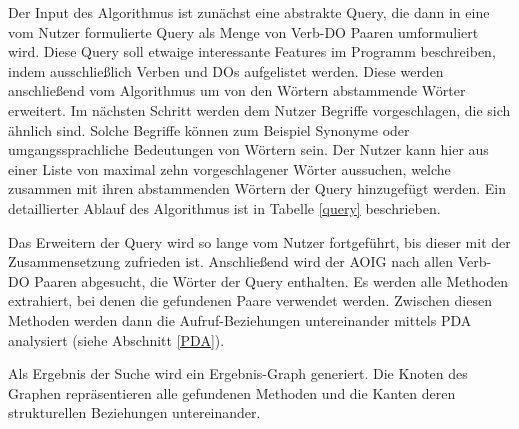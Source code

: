 \documentclass[runningheads,a4paper]{llncs}
\begin{document}
Der Input des Algorithmus ist zunächst eine abstrakte Query, die dann in eine vom Nutzer formulierte Query als Menge von Verb-DO Paaren umformuliert wird. Diese Query soll etwaige interessante Features im Programm beschreiben, indem ausschließlich Verben und DOs aufgelistet werden. Diese werden anschließend vom Algorithmus um von den Wörtern abstammende Wörter erweitert. Im nächsten Schritt werden dem Nutzer Begriffe vorgeschlagen, die sich ähnlich sind. Solche Begriffe können zum Beispiel Synonyme oder umgangssprachliche Bedeutungen von Wörtern sein. Der Nutzer kann hier aus einer Liste von maximal zehn vorgeschlagener Wörter aussuchen, welche zusammen mit ihren abstammenden Wörtern der Query hinzugefügt werden. Ein detaillierter Ablauf des Algorithmus ist in Tabelle \ref{query} beschrieben.

Das Erweitern der Query wird so lange vom Nutzer fortgeführt, bis dieser mit der Zusammensetzung zufrieden ist. Anschließend wird der AOIG nach allen Verb-DO Paaren abgesucht, die Wörter der Query enthalten. Es werden alle Methoden extrahiert, bei denen die gefundenen Paare verwendet werden. Zwischen diesen Methoden werden dann die Aufruf-Beziehungen untereinander mittels PDA analysiert (siehe Abschnitt \ref{PDA}).

Als Ergebnis der Suche wird ein Ergebnis-Graph generiert. Die Knoten des Graphen repräsentieren alle gefundenen Methoden und die Kanten deren strukturellen Beziehungen untereinander.
\end{document}
